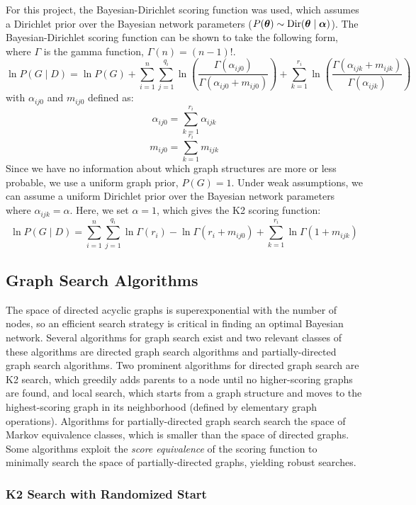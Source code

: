 \documentclass[10pt,letterpaper]{article}
\begin{document}
	For this project, the Bayesian-Dirichlet scoring function was used, which assumes a Dirichlet prior over the Bayesian network parameters ($P(\boldsymbol\theta) \sim \textnormal{Dir}(\boldsymbol\theta\mid\boldsymbol\alpha)$). The Bayesian-Dirichlet scoring function can be shown to take the following form, where $\Gamma$ is the gamma function, $\Gamma(n) = (n-1)!$.
	$$ \ln P(G \mid D) = \ln P(G) + \sum_{i=1}^n\sum_{j=1}^{q_i} \ln \left( \frac{\Gamma(\alpha_{ij0})}{\Gamma(\alpha_{ij0} + m_{ij0})} \right) + \sum_{k=1}^{r_i} \ln \left( \frac{\Gamma(\alpha_{ijk} + m_{ijk})}{\Gamma(\alpha_{ijk})} \right) $$
	with $\alpha_{ij0}$ and $m_{ij0}$ defined as:
	$$ \alpha_{ij0} = \sum_{k=1}^{r_i} \alpha_{ijk}$$
	$$ m_{ij0} = \sum_{k=1}^{r_i} m_{ijk} $$
	Since we have no information about which graph structures are more or less probable, we use a uniform graph prior, $P(G) = 1$. Under weak assumptions, we can assume a uniform Dirichlet prior over the Bayesian network parameters where $\alpha_{ijk} = \alpha$. Here, we set $\alpha = 1$, which gives the K2 scoring function:
	$$ \ln P(G \mid D) = \sum_{i=1}^n\sum_{j=1}^{q_i}\ln \Gamma(r_i) - \ln \Gamma(r_i + m_{ij0}) + \sum_{k=1}^{r_i} \ln \Gamma(1 + m_{ijk})$$
	
	\subsection*{\sf \textbf{Graph Search Algorithms}}
	
	The space of directed acyclic graphs is superexponential with the number of nodes, so an efficient search strategy is critical in finding an optimal Bayesian network. Several algorithms for graph search exist and two relevant classes of these algorithms are directed graph search algorithms and partially-directed graph search algorithms. Two prominent algorithms for directed graph search are K2 search, which greedily adds parents to a node until no higher-scoring graphs are found, and local search, which starts from a graph structure and moves to the highest-scoring graph in its neighborhood (defined by elementary graph operations). Algorithms for partially-directed graph search search the space of Markov equivalence classes, which is smaller than the space of directed graphs. Some algorithms exploit the \textit{score equivalence} of the scoring function to minimally search the space of partially-directed graphs, yielding robust searches.	
	
	\subsubsection*{\sf \textbf{K2 Search with Randomized Start}}
	
\end{document}
